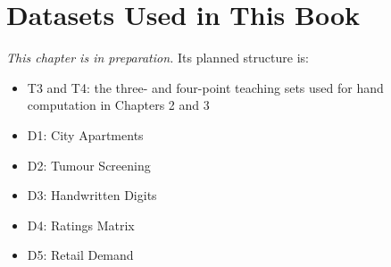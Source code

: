
\chapter{Datasets Used in This Book}
\label{ch:appD}

\noindent\textit{This chapter is in preparation.} Its planned structure is:

\begin{itemize}
  \item T3 and T4: the three- and four-point teaching sets used for hand
        computation in Chapters 2 and 3
  \item D1: City Apartments
  \item D2: Tumour Screening
  \item D3: Handwritten Digits
  \item D4: Ratings Matrix
  \item D5: Retail Demand
\end{itemize}
